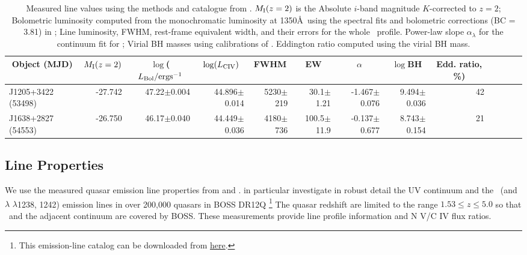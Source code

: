 \documentclass[a4paper,fleqn,usenatbib]{mnras}
\begin{document}
\begin{table}
\begin{tabular}{ l rrr rrr rrr rrr}
\hline
\hline
  \multicolumn{1}{c}{Object (MJD)} &
  \multicolumn{1}{c}{$M_{\rm I}(z=2)$} &
  \multicolumn{1}{c}{$\log$($L_{\rm Bol} / {\rm erg s}^{-1}$} &
  \multicolumn{1}{c}{$\log(L_{\rm CIV})$} &
  \multicolumn{1}{c}{FWHM} &
  \multicolumn{1}{c}{EW} &
  \multicolumn{1}{c}{$\alpha$} &
  \multicolumn{1}{c}{$\log$BH } &
  \multicolumn{1}{c}{Edd. ratio, \%)} \\
\hline
  J1205+3422 (53498)   & 
  -27.742                      & 47.22$\pm$0.004    &    %
44.896$\pm$0.014     &   5230$\pm$219          & 30.1$\pm$1.21        &  -1.467$\pm$0.076    &  %
  9.494$\pm$0.036    &  42 \\
 J1638+2827 (54553)   & 
 -26.750                      & 46.17$\pm$0.040    & %
44.449$\pm$0.036    &  4180$\pm$736          & 100.5$\pm$11.9      & -0.137$\pm$0.677    &   %
  8.743$\pm$0.154     & 21  \\
\hline
\hline
\end{tabular}
 \caption{
Measured line values using the methods and catalogue from
\citet{Shen2011}.  $M_{\rm I}(z=2)$ is the Absolute $i$-band magnitude
$K$-corrected to $z = 2$; Bolometric luminosity computed from the
monochromatic luminosity at 1350\AA\ using the spectral fits and
bolometric corrections (BC = 3.81) in \citet{Richards2006b}; Line
luminosity, FWHM, rest-frame equivalent width, and their errors for
the whole \civ\ profile.  Power-law slope $\alpha_{\lambda}$ for the
continuum fit for \civ; Virial BH masses using calibrations of
\citet{VestergaardPeterson2006}.  Eddington ratio computed using the
virial BH mass.
}
 \label{tab:Shen11_lines}
\end{table}


\subsection{Line Properties}  
We use the measured quasar emission line properties from
\citet{Shen2011} and \citet{Hamann2017}. \citet{Hamann2017} in
particular investigate in robust detail the UV continuum and the \civ\
(and \nv $\lambda$ $\lambda$1238, 1242) emission lines in over 200,000
quasars in BOSS DR12Q \citep{Paris2017}\footnote{This emission-line
catalog can be downloaded from
\href{https://datadryad.org/stash/dataset/doi:10.6086/D1H59V}{here}.}
The quasar redshift are limited to the range $1.53 \leq z \leq 5.0$ so
that \civ\ and the adjacent continuum are covered by BOSS. These
measurements provide line profile information and N V/C IV flux
ratios.
\end{document}
